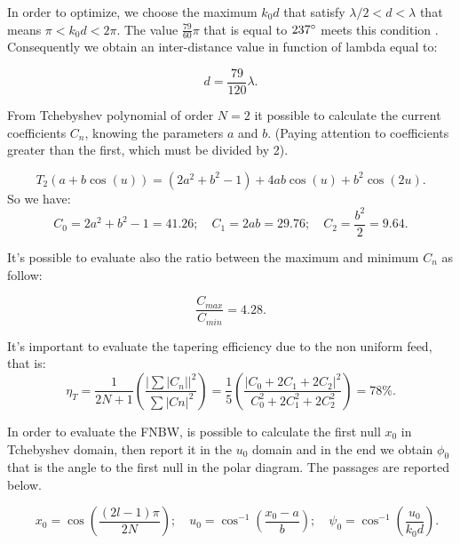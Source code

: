 \documentclass[11pt]{report}
\begin{document}
In order to optimize, we choose the maximum $k_{0}d$ that satisfy $ \lambda/2<d<\lambda $ that means $ \pi<k_{0}d<2\pi $. The value $\frac{79}{60}\pi$ that is equal to $ 237\degree$ meets this condition . Consequently we obtain an inter-distance value in function of lambda equal to:

\begin{equation}
d = \frac{79}{120}\lambda.
\end{equation}

From Tchebyshev polynomial of order $N=2$ it possible to calculate the current coefficients $C_{n}$, knowing the parameters $a$ and $b$. (Paying attention to coefficients greater than the first, which must be divided by 2).

\begin{equation}
T_{2}(a+b \cos (u))=\left(2 a^{2}+b^{2}-1\right)+4 a b \cos (u)+b^{2} \cos (2 u).
\end{equation}
So we have:
\begin{equation}
C_{0}=2 a^{2}+b^{2}-1=41.26 ; \quad C_{1}=2 a b=29.76 ; \quad C_{2}=\frac{b^{2}}{2}=9.64.
\end{equation}

It's possible to evaluate also the ratio between the maximum and minimum $C_{n}$ as follow:

\begin{equation}
\frac{C_{max}}{C_{min}}=4.28.
\end{equation}

It's important to evaluate the tapering efficiency due to the non uniform feed, that is:
\begin{equation}
\eta_{T}=\frac{1}{2 N+1}\left(\frac{\left|\sum\right| C_{n}||^{2}}{\sum|C n|^{2}}\right)=\frac{1}{5}\left(\frac{\left|C_{0}+2 C_{1}+2 C_{2}\right|^{2}}{C_{0}^{2}+2 C_{1}^{2}+2 C_{2}^{2}}\right)=78 \%.
\end{equation}

In order to evaluate the FNBW, is possible to calculate the first null $x_{0}$ in Tchebyshev domain, then report it in the $u_{0}$ domain and in the end we obtain $\phi_{0} $ that is the angle to the first null in the polar diagram. The passages are reported below.

\begin{equation}
\quad x_{0}=\cos \left(\frac{(2l-1)\pi}{2N}\right);
\quad u_{0}=\cos ^{-1}\left(\frac{x_{0}-a}{b}\right); 
\quad \psi_{0}=\cos ^{-1}\left(\frac{u_{0}}{k_{0} d}\right).
\end{equation}
\end{document}
